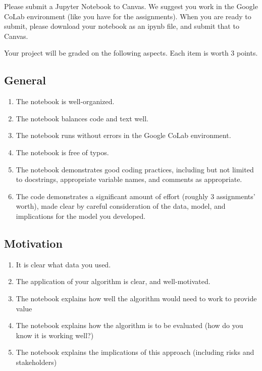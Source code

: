 \documentclass{tufte-handout}
\begin{document}
Please submit a Jupyter Notebook to Canvas. We suggest you work in the Google CoLab environment (like you have for the assignments). When you are ready to submit, please download your notebook as an ipynb file, and submit that to Canvas. 

Your project will be graded on the following aspects. Each item is worth 3 points.


\subsection{General}
\begin{enumerate}
\item The notebook is well-organized.
\item The notebook balances code and text well.
\item The notebook runs without errors in the Google CoLab environment.
\item The notebook is free of typos.
\item The notebook demonstrates good coding practices, including but not limited to docstrings, appropriate variable names, and comments as appropriate.
\item The code demonstrates a significant amount of effort (roughly 3 assignments'
  worth), made clear by careful consideration of the data, model, and implications for the model you developed.
\end{enumerate}

\subsection{Motivation}
\begin{enumerate}[resume]
\item It is clear what data you used.
\item The application of your algorithm is clear, and well-motivated.
\item The notebook explains how well the algorithm would need to work to provide value
\item The notebook explains how the algorithm is to be evaluated (how do you know it is working well?)
\item The notebook explains the implications of this approach (including risks and stakeholders)
\end{enumerate}
\end{document}
